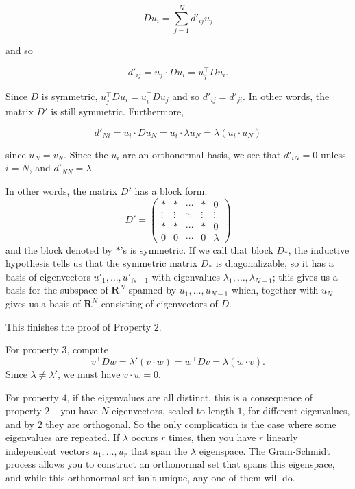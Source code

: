 \documentclass[
  oneside]{scrbook}
\begin{document}
\[
Du_{i} = \sum_{j=1}^{N} d'_{ij} u_{j}
\]

and so

\[
d'_{ij} = u_{j}\cdot Du_{i} = u_{j}^{\intercal}Du_{i}.
\]

Since \(D\) is symmetric,
\(u_{j}^{\intercal}Du_{i} =u_{i}^{\intercal}Du_{j}\) and so
\(d'_{ij}=d'_{ji}\). In other words, the matrix \(D'\) is still
symmetric. Furthermore,

\[
d'_{Ni} = u_{i}\cdot Du_{N} = u_{i}\cdot \lambda u_{N} = \lambda (u_{i}\cdot u_{N})
\]

since \(u_{N}=v_{N}\). Since the \(u_{i}\) are an orthonormal basis, we
see that \(d'_{iN}=0\) unless \(i=N\), and \(d'_{NN}=\lambda\).

In other words, the matrix \(D'\) has a block form: \[
D' = \left(\begin{matrix} * & * & \cdots &*  & 0 \\ \vdots & \vdots & \ddots   & \vdots & \vdots \\
* & * & \cdots &*  & 0 \\
0 & 0 & \cdots &0 &\lambda \end{matrix}\right)
\] and the block denoted by \(*\)'s is symmetric. If we call that block
\(D_{*}\), the inductive hypothesis tells us that the symmetric matrix
\(D_{*}\) is diagonalizable, so it has a basis of eigenvectors
\(u'_{1},\ldots, u'_{N-1}\) with eigenvalues
\(\lambda_{1},\ldots, \lambda_{N-1}\); this gives us a basis for the
subspace of \(\mathbf{R}^{N}\) spanned by \(u_{1},\ldots, u_{N-1}\)
which, together with \(u_{N}\) gives us a basis of \(\mathbf{R}^{N}\)
consisting of eigenvectors of \(D\).

This finishes the proof of Property \(2\).

For property \(3\), compute \[
v^{\intercal}Dw = \lambda'(v\cdot w)=w^{\intercal}Dv = \lambda (w\cdot v).
\] Since \(\lambda\not=\lambda'\), we must have \(v\cdot w=0\).

For property \(4\), if the eigenvalues are all distinct, this is a
consequence of property \(2\) -- you have \(N\) eigenvectors, scaled to
length \(1\), for different eigenvalues, and by \(2\) they are
orthogonal. So the only complication is the case where some eigenvalues
are repeated. If \(\lambda\) occurs \(r\) times, then you have \(r\)
linearly independent vectors \(u_{1},\ldots, u_{r}\) that span the
\(\lambda\) eigenspace. The Gram-Schmidt process allows you to construct
an orthonormal set that spans this eigenspace, and while this
orthonormal set isn't unique, any one of them will do.
\end{document}
